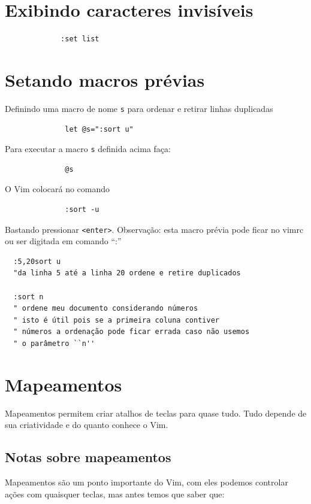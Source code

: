 \documentclass[10pt,a4paper,openany]{book}
\begin{document}
\section{Exibindo caracteres invisíveis}
\label{Exibindo caracteres invisíveis}

\begin{verbatim}
			 :set list
\end{verbatim}

\section{Setando macros prévias }
\label{Setando macros prévias }
Definindo uma macro de nome \verb|s| para ordenar e retirar linhas duplicadas

\begin{verbatim}
			  let @s=":sort u"
\end{verbatim}

Para executar a macro \verb|s| definida acima faça:

\begin{verbatim}
			  @s
\end{verbatim}

O Vim colocará no comando

\begin{verbatim}
			  :sort -u
\end{verbatim}

Bastando pressionar \verb|<enter>|.
Observação: esta macro prévia pode ficar no vimrc ou ser digitada em comando ``:''


\begin{verbatim}
  :5,20sort u
  "da linha 5 até a linha 20 ordene e retire duplicados

  :sort n
  " ordene meu documento considerando números
  " isto é útil pois se a primeira coluna contiver
  " números a ordenação pode ficar errada caso não usemos
  " o parâmetro ``n''
\end{verbatim}

\section{Mapeamentos}\label{Mapeamentos}

Mapeamentos permitem criar atalhos de teclas para quase tudo. Tudo depende de
sua criatividade e do quanto conhece o Vim. 


\subsection{Notas sobre mapeamentos}\label{Notas sobre mapeamentos}
Mapeamentos são um ponto importante do Vim, com eles podemos controlar
ações com quaisquer teclas, mas antes temos que saber que:
\end{document}
